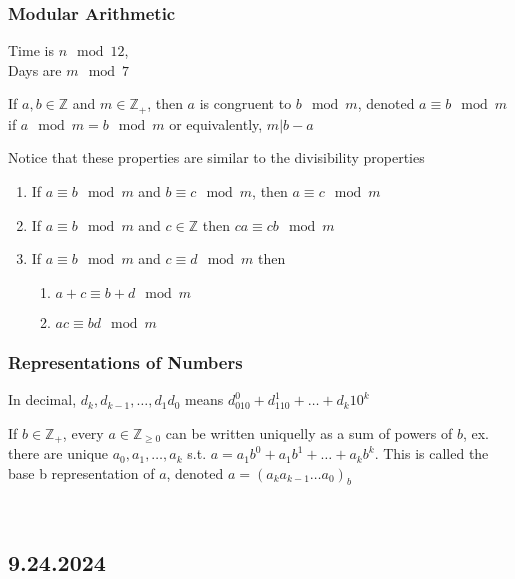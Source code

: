 \documentclass[11pt]{scrartcl}
\begin{document}
\subsubsection{Modular Arithmetic}
\begin{example}
    Time is $n\mod 12$,\\
    Days are $m\mod 7$
\end{example}
\begin{definition}
    If $a, b \in \mathbb{Z}$ and $m \in \mathbb{Z}_+$, then $a$ is congruent to $b \mod m$, denoted $a \equiv b \mod m$ if $a \mod m = b \mod m$ or equivalently, $m | b-a$
\end{definition}
\begin{proposition}
    Notice that these properties are similar to the divisibility properties
    \begin{enumerate}
        \item If $a \equiv b \mod m$ and $b \equiv c \mod m$, then $a \equiv c \mod m$
        \item If $a \equiv b \mod m$ and $c \in \mathbb{Z}$ then $ca \equiv cb \mod m$
        \item If $a \equiv b \mod m$ and $c \equiv d \mod m$ then \begin{enumerate}
            \item $a+c \equiv b+d \mod m$
            \item $ac \equiv bd \mod m$
        \end{enumerate}
    \end{enumerate}
\end{proposition}

\subsubsection{Representations of Numbers}
In decimal, $d_k, d_{k-1}, \dots , d_1 d_0$ means $d_010^0 + d_110^1 + \dots + d_k10^k$\\
\begin{fact}
    If $b \in \mathbb{Z}_+$, every $a \in \mathbb{Z}_{\geq 0}$ can be written uniquelly as a sum of powers of $b$, ex. there are unique $a_0, a_1,\dots , a_k$ s.t. $a = a_1b^0 + a_1b^1 + \dots + a_kb^k$.  This is called the base b representation of $a$, denoted $a = (a_ka_{k-1} \dots a_0)_b$
\end{fact}
\noindent
\Line
\\
\subsection{9.24.2024}
\end{document}
